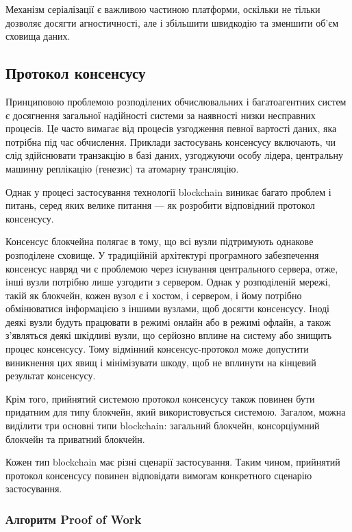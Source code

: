 \documentclass{lib/styles/default-style}
\begin{document}
    Механізм серіалізації є важливою частиною платформи, оскільки не тільки дозволяє досягти агностичності, але і збільшити
    швидкодію та зменшити об’єм сховища даних.

\subsection{Протокол консенсусу}

    Принциповою проблемою розподілених обчислювальних і багатоагентних систем
    є досягнення загальної надійності системи за наявності низки несправних процесів.
    Це часто вимагає від процесів узгодження певної вартості даних, яка потрібна під час обчислення.
    Приклади застосувань консенсусу включають, чи слід здійснювати транзакцію в базі даних, узгоджуючи особу лідера,
    центральну машинну реплікацію (генезис) та атомарну трансляцію.
    
    Однак у процесі застосування технології blockchain виникає багато проблем і питань,
    серед яких велике питання --- як розробити відповідний протокол консенсусу.

    Консенсус блокчейна полягає в тому, що всі вузли підтримують однакове розподілене сховище.
    У традиційній архітектурі програмного забезпечення консенсус навряд чи є проблемою через існування центрального сервера,
    отже, інші вузли потрібно лише узгодити з сервером. Однак у розподіленій мережі, такій як блокчейн, кожен вузол є і хостом,
    і сервером, і йому потрібно обмінюватися інформацією з іншими вузлами, щоб досягти консенсусу. Іноді деякі вузли будуть
    працювати в режимі онлайн або в режимі офлайн, а також з’являться деякі шкідливі вузли, що серйозно вплине на систему або знищить
    процес консенсусу. Тому відмінний консенсус-протокол може допустити виникнення цих явищ і мінімізувати шкоду,
    щоб не вплинути на кінцевий результат консенсусу.
    
    Крім того, прийнятий системою протокол консенсусу
    також повинен бути придатним для типу блокчейн, який використовується системою. Загалом, можна виділити три основні типи blockchain:
    загальний блокчейн, консорціумний блокчейн та приватний блокчейн.
    
    Кожен тип blockchain має різні сценарії застосування.
    Таким чином, прийнятий протокол консенсусу повинен відповідати вимогам конкретного сценарію застосування.

    \subsubsection{Алгоритм Proof of Work}
\end{document}
